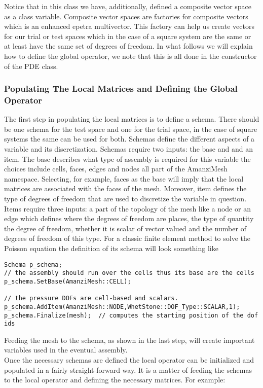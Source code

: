 %
Notice that in this class we have, additionally, defined a composite vector space as a class variable. Composite vector spaces are factories for composite vectors which is an enhanced epetra multivector. This factory can help us create vectors for our trial or test spaces which in the case of a square system are the same or at least have the same set of degrees of freedom. In what follows we will explain how to define the global operator, we note that this is all done in the constructor of the PDE class.
%
\subsubsection{Populating The Local Matrices and Defining the Global Operator}\label{Sec:LocalMatAndGlobalOp}
%
The first step in populating the local matrices is to define a schema. There should be one schema for the test space and one for the trial space, in the case of square systems the same can be used for both. Schemas define the different aspects of a variable and its discretization. Schemas require two inputs: the base and and an item. The base describes what type of assembly is required for this variable the choices include cells, faces, edges and nodes all part of the AmanziMesh namespace. Selecting, for example, faces as the base will imply that the local matrices are associated with the faces of the mesh. Moreover, item defines the type of degrees of freedom that are used to discretize the variable in question. Items require three inputs: a part of the topology of the mesh like a node or an edge which defines where the degrees of freedom are places, the type of quantity the degree of freedom, whether it is scalar of vector valued and the number of degrees of freedom of this type. For a classic finite element method to solve the Poisson equation the definition of its schema will look something like
%
\begin{lstlisting}
Schema p_schema;
// the assembly should run over the cells thus its base are the cells
p_schema.SetBase(AmanziMesh::CELL);

// the pressure DOFs are cell-based and scalars.
p_schema.AddItem(AmanziMesh::NODE,WhetStone::DOF_Type::SCALAR,1);
p_schema.Finalize(mesh);  // computes the starting position of the dof ids
\end{lstlisting}
%
Feeding the mesh to the schema, as shown in the last step, will create important variables used in the eventual assembly.\\
%
Once the necessary schemas are defined the local operator can be initialized and populated in a fairly straight-forward way. It is a matter of feeding the schemas to the local operator and defining the necessary matrices. For example:
